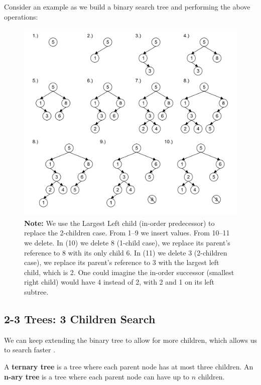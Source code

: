 \newpage 

\noindent
Consider an example as we build a binary search tree and performing the above operations:
\begin{figure}[h]
    \centering
    \includegraphics[width=\textwidth]{./Sections/graphs/search/bst_ex.png}
    \caption{%
        \textbf{Note:} We use the Largest Left child (in-order predecessor) to replace the 2-children case. From 
        1--9 we insert values. From 10--11 we delete. In (10) we delete 8 (1-child case), we replace its 
        parent's reference to 8 with its only child 6. In (11) we delete 3 (2-children case), we replace its parent's reference to 3 with the largest left child, which is 2.
        One could imagine the in-order successor (smallest right child) would have 4 instead of 2, with 2 and 1 on its left subtree.}
    \label{fig:bst_operations}
\end{figure}

\newpage 
\subsection{2-3 Trees: 3 Children Search}

\noindent
We can keep extending the binary tree to allow for more children, which allows us to search faster \cite{mount2020cmsc420-lecture6}.

\begin{Def}

    A \textbf{ternary tree} is a tree where each parent node has at most three children. An \textbf{n-ary tree} is a tree where each parent node can have up to $n$ children.
\end{Def}


